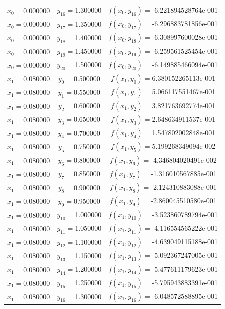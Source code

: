 \begin{longtable}{ccc}
$x_{0}=$0.000000 & $y_{16}=$1.300000 & $f(x_{0},y_{16})=$-6.221894528764e-001 \\
$x_{0}=$0.000000 & $y_{17}=$1.350000 & $f(x_{0},y_{17})=$-6.296883781856e-001 \\
$x_{0}=$0.000000 & $y_{18}=$1.400000 & $f(x_{0},y_{18})=$-6.308997600028e-001 \\
$x_{0}=$0.000000 & $y_{19}=$1.450000 & $f(x_{0},y_{19})=$-6.259561525454e-001 \\
$x_{0}=$0.000000 & $y_{20}=$1.500000 & $f(x_{0},y_{20})=$-6.149885466094e-001 \\
$x_{1}=$0.080000 & $y_{0}=$0.500000 & $f(x_{1},y_{0})=$6.380152265113e-001 \\
$x_{1}=$0.080000 & $y_{1}=$0.550000 & $f(x_{1},y_{1})=$5.066117551467e-001 \\
$x_{1}=$0.080000 & $y_{2}=$0.600000 & $f(x_{1},y_{2})=$3.821763692774e-001 \\
$x_{1}=$0.080000 & $y_{3}=$0.650000 & $f(x_{1},y_{3})=$2.648634911537e-001 \\
$x_{1}=$0.080000 & $y_{4}=$0.700000 & $f(x_{1},y_{4})=$1.547802002848e-001 \\
$x_{1}=$0.080000 & $y_{5}=$0.750000 & $f(x_{1},y_{5})=$5.199268349094e-002 \\
$x_{1}=$0.080000 & $y_{6}=$0.800000 & $f(x_{1},y_{6})=$-4.346804020491e-002 \\
$x_{1}=$0.080000 & $y_{7}=$0.850000 & $f(x_{1},y_{7})=$-1.316010567885e-001 \\
$x_{1}=$0.080000 & $y_{8}=$0.900000 & $f(x_{1},y_{8})=$-2.124310883088e-001 \\
$x_{1}=$0.080000 & $y_{9}=$0.950000 & $f(x_{1},y_{9})=$-2.860045510580e-001 \\
$x_{1}=$0.080000 & $y_{10}=$1.000000 & $f(x_{1},y_{10})=$-3.523860789794e-001 \\
$x_{1}=$0.080000 & $y_{11}=$1.050000 & $f(x_{1},y_{11})=$-4.116554565222e-001 \\
$x_{1}=$0.080000 & $y_{12}=$1.100000 & $f(x_{1},y_{12})=$-4.639049115188e-001 \\
$x_{1}=$0.080000 & $y_{13}=$1.150000 & $f(x_{1},y_{13})=$-5.092367247005e-001 \\
$x_{1}=$0.080000 & $y_{14}=$1.200000 & $f(x_{1},y_{14})=$-5.477611179623e-001 \\
$x_{1}=$0.080000 & $y_{15}=$1.250000 & $f(x_{1},y_{15})=$-5.795943883391e-001 \\
$x_{1}=$0.080000 & $y_{16}=$1.300000 & $f(x_{1},y_{16})=$-6.048572588895e-001 \\

\end{longtable}
